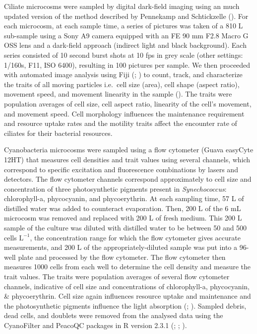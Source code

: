 \documentclass[
  letterpaper,
  DIV=11,
  numbers=noendperiod]{scrartcl}
\begin{document}
Ciliate microcosms were sampled by digital dark-field imaging using an
much updated version of the method described by Pennekamp and
Schtickzelle (). For each microcosm,
at each sample time, a series of pictures was taken of a 810 \textmu L
sub-sample using a Sony A9 camera equipped with an FE 90 mm F2.8 Macro G
OSS lens and a dark-field approach (indirect light and black
background). Each series consisted of 10 second burst shots at 10 fps in
grey scale (other settings: 1/160s, F11, ISO 6400), resulting in 100
pictures per sample. We then proceeded with automated image analysis
using Fiji (;
) to count, track, and
characterize the traits of all moving particles i.e.~cell size (area),
cell shape (aspect ratio), movement speed, and movement linearity in the
sample (). The traits
were population averages of cell size, cell aspect ratio, linearity of
the cell's movement, and movement speed. Cell morphology influences the
maintenance requirement and resource uptake rates and the motility
traits affect the encounter rate of ciliates for their bacterial
resources.

Cyanobacteria microcosms were sampled using a flow cytometer (Guava
easyCyte 12HT) that measures cell densities and trait values using
several channels, which correspond to specific excitation and
fluorescence combinations by lasers and detectors. The flow cytometer
channels correspond approximately to cell size and concentration of
three photosynthetic pigments present in \emph{Synechococcus}:
chlorophyll-a, phycocyanin, and phycoerythrin. At each sampling time, 57
\textmu  L of distilled water was added to counteract evaporation. Then,
200 \textmu L of the 6 mL microcosm was removed and replaced with 200
\textmu L of fresh medium. This 200 \textmu L sample of the culture was
diluted with distilled water to be between 50 and 500 cells
\textmu \(\mathrm{L}^{-1}\), the concentration range for which the flow
cytometer gives accurate measurements, and 200 \textmu L of the
appropriately-diluted sample was put into a 96-well plate and processed
by the flow cytometer. The flow cytometer then measures 1000 cells from
each well to determine the cell density and measure the trait values.
The traits were population averages of several flow cytometer channels,
indicative of cell size and concentrations of chlorophyll-a,
phycocyanin, \& phycoerythrin. Cell size again influences resource
uptake and maintenance and the photosynthetic pigments influence the
light absorption (;
). Sampled debris, dead
cells, and doublets were removed from the analysed data using the
CyanoFilter and PeacoQC packages in R version 2.3.1
(;
; ).
\end{document}
